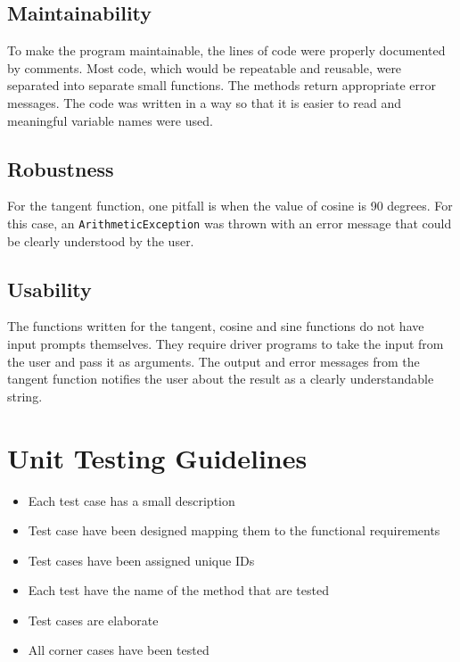 \documentclass[paper=a4, fontsize=11pt,twoside]{scrartcl}	%
\begin{document}
    \subsection{Maintainability}
    To make the program maintainable, the lines of code were properly documented by comments. Most code, which would be repeatable and reusable, were separated into separate small functions. The methods return appropriate error messages. The code was written in a way so that it is easier to read and meaningful variable names were used.
    \subsection{Robustness}
    For the tangent function, one pitfall is when the value of cosine is 90 degrees. For this case, an \texttt{ArithmeticException} was thrown with an error message that could be clearly understood by the user.
    \subsection{Usability}
    The functions written for the tangent, cosine and sine functions do not have input prompts themselves. They require driver programs to take the input from the user and pass it as arguments. The output and error messages from the tangent function notifies the user about the result as a clearly understandable string.
    \section{Unit Testing Guidelines}
    \begin{itemize}
        \item Each test case has a small description
        \item Test case have been designed mapping them to the functional requirements
        \item Test cases have been assigned unique IDs
        \item Each test have the name of the method that are tested
        \item Test cases are elaborate
        \item All corner cases have been tested
    \end{itemize}
\end{document}
